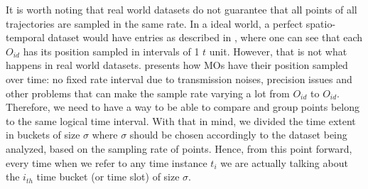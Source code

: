 It is worth noting that real world datasets do not guarantee that all points of all trajectories are sampled in the same
rate. In a ideal world, a perfect spatio-temporal dataset would have entries as described in ,
where one can see that each $O_{id}$ has its position sampled in intervals of 1 $t$ unit. However, that is not what
happens in real world datasets.  presents how MOs have their position sampled over time: no fixed
rate interval due to transmission noises, precision issues and other problems that can make the sample rate varying a
lot from $O_{id}$ to $O_{id}$. Therefore, we need to have a way to be able to compare and group points belong to the
same logical time interval. With that in mind, we divided the time extent in buckets of size $\sigma$ where $\sigma$
should be chosen accordingly to the dataset being analyzed, based on the sampling rate of points. Hence, from this point
forward, every time when we refer to any time instance $t_i$ we are actually talking about the $i_{th}$ time bucket (or
time slot) of size $\sigma$.


